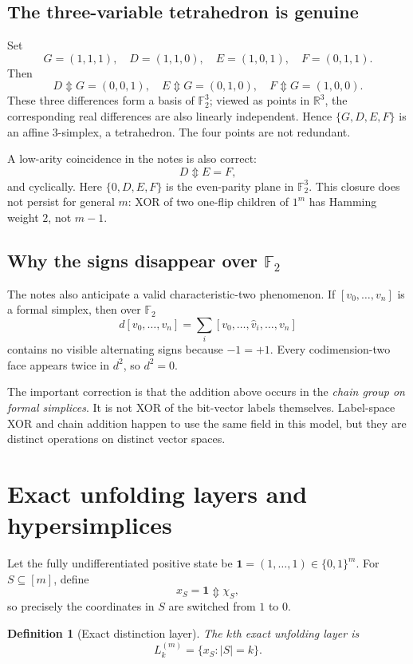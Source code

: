\documentclass[11pt]{article}
\newtheorem{definition}[theorem]{Definition}
\newcommand{\Ftwo}{\mathbb F_2}
\newcommand{\Updown}{\mathbin{\Updownarrow}}
\begin{document}
\subsection{The three-variable tetrahedron is genuine}
Set
\[
G=(1,1,1),\quad D=(1,1,0),\quad E=(1,0,1),\quad F=(0,1,1).
\]
Then
\[
D\Updown G=(0,0,1),\quad E\Updown G=(0,1,0),\quad F\Updown G=(1,0,0).
\]
These three differences form a basis of $\Ftwo^3$; viewed as points in $\mathbb R^3$, the corresponding real differences are also linearly independent.  Hence $\{G,D,E,F\}$ is an affine $3$-simplex, a tetrahedron.  The four points are not redundant.

A low-arity coincidence in the notes is also correct:
\[
D\Updown E=F,
\]
and cyclically.  Here $\{0,D,E,F\}$ is the even-parity plane in $\Ftwo^3$.  This closure does not persist for general $m$: XOR of two one-flip children of $1^m$ has Hamming weight $2$, not $m-1$.

\subsection{Why the signs disappear over \texorpdfstring{$\Ftwo$}{F2}}
The notes also anticipate a valid characteristic-two phenomenon.  If $[v_0,\dots,v_n]$ is a formal simplex, then over $\Ftwo$
\[
d[v_0,\dots,v_n]
=\sum_i[v_0,\dots,\widehat v_i,\dots,v_n]
\]
contains no visible alternating signs because $-1=+1$.  Every codimension-two face appears twice in $d^2$, so $d^2=0$.

The important correction is that the addition above occurs in the \emph{chain group on formal simplices}.  It is not XOR of the bit-vector labels themselves.  Label-space XOR and chain addition happen to use the same field in this model, but they are distinct operations on distinct vector spaces.

\section{Exact unfolding layers and hypersimplices}

Let the fully undifferentiated positive state be $\mathbf 1=(1,\dots,1)\in\{0,1\}^m$.  For $S\subseteq[m]$, define
\[
x_S=\mathbf 1\Updown \chi_S,
\]
so precisely the coordinates in $S$ are switched from $1$ to $0$.

\begin{definition}[Exact distinction layer]
The $k$th exact unfolding layer is
\[
L_k^{(m)}=\{x_S:|S|=k\}.
\]
\end{definition}
\end{document}
